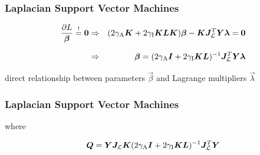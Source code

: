 \begin{frame}
  \frametitle{Laplacian Support Vector Machines \cont}
  
  
  \begin{eqnarray*}
    \frac{\partial L}{{\bm \beta}} \stackrel{!}{=} {\bm 0} 
    &\Rightarrow& 
    (2 \gamma_\text{A} {\bm K} + 2 \gamma_\text{I} {\bm K}{\bm L}{\bm K}) {\bm \beta} -
    {\bm K} {\bm J}_{\mathcal{L}}^T {\bm Y} {\bm \lambda} = {\bm 0} \\[.25cm]
    &\Rightarrow& 
    {\bm \beta} = (2 \gamma_\text{A} {\bm I} + 2 \gamma_\text{I} {\bm K}{\bm L})^{-1} 
    {\bm J}_{\mathcal{L}}^T {\bm Y} {\bm \lambda}
  \end{eqnarray*}
  \pspread
  
   direct relationship between parameters $\vec{\beta}$ and Lagrange multipliers $\vec{\lambda}$
\end{frame}


\begin{frame}
  \frametitle{Laplacian Support Vector Machines \cont}
  

  \begin{center}
    \small
  \end{center}
  
  where 
  
  {\small
  \begin{displaymath}
    {\bm Q} = {\bm Y} {\bm J}_{\mathcal{L}} {\bm K} 
    (2 \gamma_\text{A} {\bm I} + 2 \gamma_\text{I} {\bm K}{\bm L})^{-1} 
    {\bm J}_{\mathcal{L}}^T {\bm Y}
  \end{displaymath}
  }
\end{frame}


